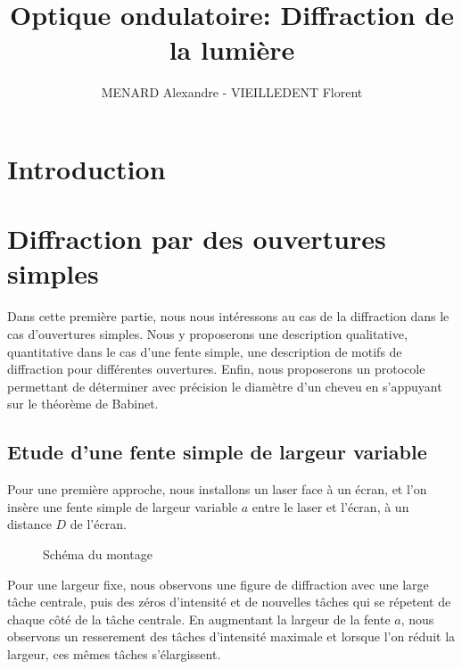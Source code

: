 \documentclass[12pt]{article}
\title{\textbf{Optique ondulatoire:} Diffraction de la lumière}
\author{MENARD Alexandre - VIEILLEDENT Florent}
\begin{document}
\maketitle

\section*{Introduction}

\break
\section{Diffraction par des ouvertures simples}
Dans cette première partie, nous nous intéressons au cas de la diffraction dans le cas d'ouvertures simples. Nous y proposerons une description qualitative, quantitative dans le cas d'une fente simple,
une description de motifs de diffraction pour différentes ouvertures. Enfin, nous proposerons un protocole permettant de déterminer avec précision le diamètre d'un cheveu en s'appuyant sur le théorème de Babinet.
\subsection{Etude d'une fente simple de largeur variable}
Pour une première approche, nous installons un laser face à un écran, et l'on insère une fente simple de largeur variable $a$ entre le laser et l'écran, à un distance $D$ de l'écran.
\begin{figure}[!h]
    \begin{center}
        \resizebox{0.7\textwidth}{5cm}{
        
        }
    \end{center}
    \caption{Schéma du montage}
    \label{fig:montage_simple}
\end{figure}

Pour une largeur fixe, nous observons une figure de diffraction avec une large tâche centrale, puis des zéros d'intensité et de nouvelles tâches qui se répetent de chaque côté de la tâche centrale.
En augmentant la largeur de la fente $a$, nous observons un resserement des tâches d'intensité maximale et lorsque l'on réduit la largeur, ces mêmes tâches s'élargissent.
\end{document}
